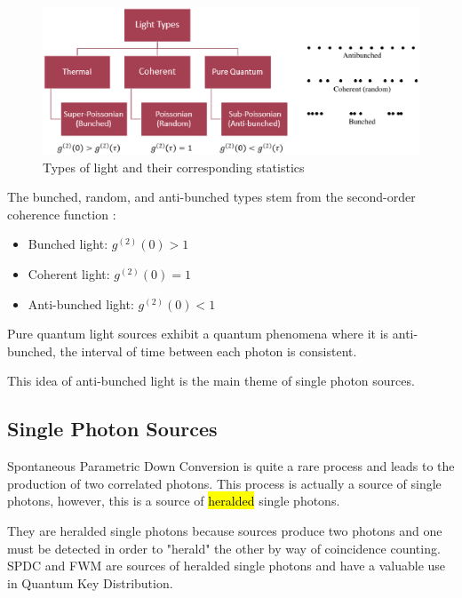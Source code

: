 \documentclass{article}
\begin{document}
\begin{figure}[!phbt]
    \centering
    \includegraphics[width=0.85\linewidth]{img/lighttypes.eps}
    \caption{Types of light and their corresponding statistics}
    \label{fig:fwm}
\end{figure}
The bunched, random, and anti-bunched types stem from the second-order coherence function \cite{foxqmoptics}:
\begin{itemize}
    \item Bunched light: $g^{(2)}(0) > 1$
    \item Coherent light: $g^{(2)}(0) = 1$
    \item Anti-bunched light: $g^{(2)}(0) < 1$
\end{itemize}

Pure quantum light sources exhibit a quantum phenomena where it is anti-bunched, the interval of time between each photon is consistent.

This idea of anti-bunched light is the main theme of single photon sources.

\subsection{Single Photon Sources}
Spontaneous Parametric Down Conversion is quite a rare process and leads to the production of two correlated photons. This process is actually a source of single photons, however, this is a source of \hl{heralded} single photons.

They are heralded single photons because sources produce two photons and one must be detected in order to "herald" the other by way of coincidence counting.
SPDC and FWM are sources of heralded single photons and have a valuable use in Quantum Key Distribution.


\end{document}
